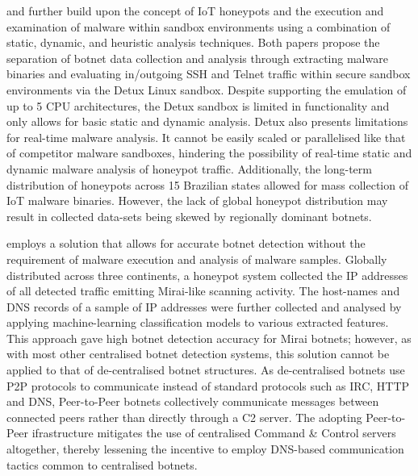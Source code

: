 \citet{Bastos2019} and \citet{Ceron2019} further build upon the concept of IoT honeypots and the execution and examination of malware within sandbox environments using a combination of static, dynamic, and heuristic analysis techniques. Both papers propose the separation of botnet data collection and analysis through extracting malware binaries and evaluating in/outgoing SSH and Telnet traffic within secure sandbox environments via the Detux \citep{Detux2016} Linux sandbox. Despite supporting the emulation of up to 5 CPU architectures, the Detux sandbox is limited in functionality and only allows for basic static and dynamic analysis. Detux also presents limitations for real-time malware analysis. It cannot be easily scaled or parallelised like that of competitor malware sandboxes, hindering the possibility of real-time static and dynamic malware analysis of honeypot traffic. Additionally, the long-term distribution of honeypots across 15 Brazilian states allowed for mass collection of IoT malware binaries. However, the lack of global honeypot distribution may result in collected data-sets being skewed by regionally dominant botnets. 

\citet{Dwyer2019} employs a solution that allows for accurate botnet detection without the requirement of malware execution and analysis of malware samples. Globally distributed across three continents, a honeypot system collected the IP addresses of all detected traffic emitting Mirai-like scanning activity. The host-names and DNS records of a sample of IP addresses were further collected and analysed by applying machine-learning classification models to various extracted features. This approach gave high botnet detection accuracy for Mirai botnets; however, as with most other centralised botnet detection systems, this solution cannot be applied to that of de-centralised botnet structures. As de-centralised botnets use P2P protocols to communicate instead of standard protocols such as IRC, HTTP and DNS, Peer-to-Peer botnets collectively communicate messages between connected peers rather than directly through a C2 server. The adopting Peer-to-Peer ifrastructure mitigates the use of centralised Command \& Control servers altogether, thereby lessening the incentive to employ DNS-based communication tactics common to centralised botnets. 

